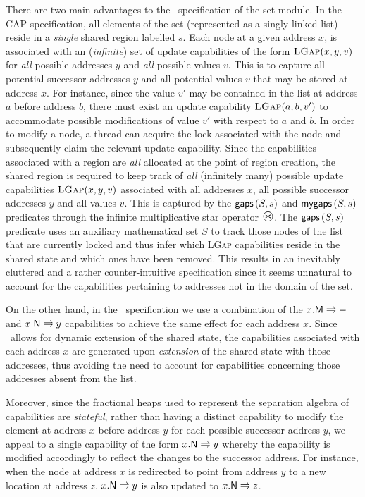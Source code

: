 There are two main advantages to the \colosl\ specification of the set module. In the CAP specification, all elements of the set (represented as a singly-linked list) reside in a \emph{single} shared region labelled $s$.
Each node at a given address $x$, is associated with an (\emph{infinite}) set of update capabilities of the form $\textsc{LGap}(x, y, v)$ for \emph{all} possible addresses $y$ and \emph{all} possible values $v$. This is to capture all potential successor addresses $y$ and all potential values $v$ that may be stored at address $x$. For instance, since the value $v'$ may be contained in the list at address $a$ before address $b$, there must exist an update capability $\textsc{LGap}(a, b, v')$ to accommodate possible modifications of value $v'$ with respect to $a$ and $b$. In order to modify a node, a thread can acquire the lock associated with the node and subsequently claim the relevant update capability. Since the capabilities associated with a region are \emph{all} allocated at the point of region creation, the shared region is required to keep track of \emph{all} (infinitely many) possible update capabilities $\textsc{LGap}(x, y, v)$ associated with all addresses $x$, all possible successor addresses $y$ and all values $v$. This is captured by the $\textsf{gaps}\left(S, s\right)$ and $\textsf{mygaps}\left(S, s\right)$ predicates through the infinite multiplicative star operator $\iterStar$. The $\textsf{gaps}\left(S, s\right)$ predicate uses an auxiliary mathematical set $S$ to track those nodes of the list that are currently locked and thus infer which \textsc{LGap} capabilities reside in the shared state and which ones have been removed. This results in an inevitably cluttered and a rather counter-intuitive specification since it seems unnatural to account for the capabilities pertaining to addresses not in the domain of the set. 

On the other hand, in the \colosl\ specification we use a combination of the $\modT{x}$ and $\nextT{x}{y}$ capabilities to achieve the same effect for each address $x$. Since \colosl\ allows for dynamic extension of the shared state, the capabilities associated with each address $x$ are generated upon \emph{extension} of the shared state with those addresses, thus avoiding the need to account for capabilities concerning those addresses absent from the list. 

Moreover, since the fractional heaps used to represent the separation algebra of capabilities are \emph{stateful}, rather than having a distinct capability to modify the element at address $x$ before address $y$ for each possible successor address $y$, we appeal to a single capability of the form $\nextT{x}{y}$ whereby the capability is modified accordingly to reflect the changes to the successor address. For instance, when the node at address $x$ is redirected to point from address $y$ to a new location at address $z$, $\nextT{x}{y}$ is also updated to $\nextT{x}{z}$. 

